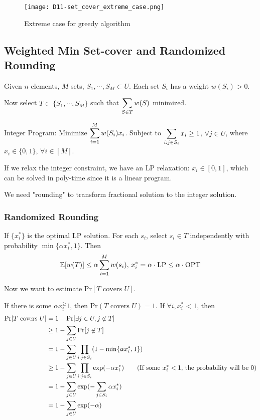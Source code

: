 \begin{figure}[htbp]
    \centering
    \texttt{[image: D11-set\_cover\_extreme\_case.png]}
    \caption{Extreme case for greedy algorithm}
\end{figure}
\subsection{Weighted Min Set-cover and Randomized Rounding}
\begin{example}
    Given  $ n $ elements,  $ M $ sets,  $ S_1,\cdots,S_M\subset U $. Each set  $ S_i $ has a weight  $ w(S_i)>0 $.

    Now select  $ T\subset\{S_1,\cdots, S_M\} $ such that  $ \displaystyle\sum_{S\in T}w(S) $ minimized. 
\end{example}
Integer Program: Minimize  $ \displaystyle\sum_{i=1}^M w(S_i)x_i $. Subject to   $ \displaystyle\sum_{i:j\in S_i} x_i \geq 1$,  $ \forall j\in U $, where  $ x_i\in \{0,1\} $,  $ \forall i\in [M] $.

If we relax the integer constraint, we have an LP relaxation:  $ x_i\in[0,1] $, which can be solved in poly-time since it is a linear program.

We need "rounding" to transform fractional solution to the integer solution.

\subsubsection{Randomized Rounding}
If  $ \{x_i^*\} $ is the optimal LP solution.  For each  $ s_i $, select  $ s_i\in T $ independently with probability   $ \min\{\alpha x_i^*,1\} $. Then 
\[\mathbb E[w(T)] \leq \alpha\sum_{i=1}^M w(s_i),\,x_i^*=\alpha\cdot \mathrm{LP} \leq \alpha\cdot \mathrm{OPT}\] 

Now we want to estimate  $ \mathrm{Pr}[T\text{ covers }U] $.

If there is some  $ \alpha x_i^ \geq 1 $, then  $ \mathrm{Pr}(T\text{ covers }U)=1 $. If  $ \forall i, x_i^*<1 $,   
then 
\[\begin{aligned}
    \mathrm{Pr}[T\text{ covers }U]&=1-\mathrm{Pr}[ \exists j\in U , j\not\in T ]\\
    & \geq 1-\sum_{j\in U}\mathrm{Pr}[j\not\in T]\\
    &=1-\sum_{j\in U}\prod_{i: j\in S_i}(1-\min\{\alpha x_i^*,1\})\\
    & \geq 1-\sum_{j\in U}\prod_{i: j\in S_i}\exp(-\alpha x_i^*)\qquad\text{(If some $ x_i^*<1 $, the probability will be 0)}\\
    &=1-\sum_{j\in U}\exp(-\sum_{j\in S_i}\alpha x_i^*)\\
    &=1-\sum_{j\in U}\exp(-\alpha)
\end{aligned}\]


